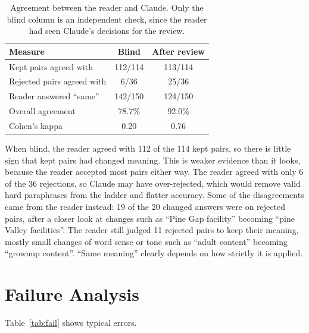 \documentclass[11pt]{article}
\begin{document}
\begin{table}[t]
\centering\small
\begin{tabular}{@{}lcc@{}}
\toprule
\textbf{Measure} & \textbf{Blind} & \textbf{After review} \\
\midrule
Kept pairs agreed with & 112/114 & 113/114 \\
Rejected pairs agreed with & 6/36 & 25/36 \\
Reader answered “same” & 142/150 & 124/150 \\
Overall agreement & 78.7\% & 92.0\% \\
Cohen's kappa & 0.20 & 0.76 \\
\bottomrule
\end{tabular}
\caption{Agreement between the reader and Claude. Only the blind column is an independent check, since the reader had seen Claude's decisions for the review.}
\label{tab:human}
\end{table}

When blind, the reader agreed with 112 of the 114 kept pairs, so there is little sign that kept pairs had changed meaning. This is weaker evidence than it looks, because the reader accepted most pairs either way. The reader agreed with only 6 of the 36 rejections, so Claude may have over-rejected, which would remove valid hard paraphrases from the ladder and flatter accuracy. Some of the disagreements came from the reader instead: 19 of the 20 changed answers were on rejected pairs, after a closer look at changes such as “Pine Gap facility” becoming “pine Valley facilities”. The reader still judged 11 rejected pairs to keep their meaning, mostly small changes of word sense or tone such as “adult content” becoming “grownup content”. “Same meaning” clearly depends on how strictly it is applied.

\section{Failure Analysis}
Table~\ref{tab:fail} shows typical errors.
\end{document}
